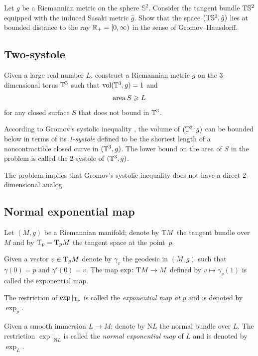 \begin{pr}
Let $g$ be a Riemannian metric on the sphere $\mathbb{S}^2$.
Consider the tangent bundle $\mathrm{T} \mathbb{S}^2$ 
equipped with the induced Sasaki metric $\hat g$.
Show that
the space $(\mathrm{T} \mathbb{S}^2, \hat g)$ lies at bounded distance to the ray $\mathbb{R}_+=[0,\infty)$ in the sense of Gromov--Hausdorff.
\end{pr}


\subsection*{Two-systole}

\begin{pr} Given a large real number $L$,
construct a Riemannian metric $g$ on the 3-dimensional torus $\mathbb{T}^3$ such that $\operatorname{\rm vol}\nolimits(\mathbb{T}^3,g)=1$
and \[\operatorname{\rm area}\nolimits S\geqslant L\]
for any closed surface $S$ that does not bound in $\mathbb{T}^3$.
\end{pr}

According to Gromov's systolic inequality \cite{gromov-filling}, the volume of $(\mathbb{T}^3,g)$ can be bounded below in terms of its \emph{1-systole} defined to be the shortest length of a noncontractible closed curve in $(\mathbb{T}^3,g)$.
The lower bound on the area of $S$ in the problem is called the 2-systole of $(\mathbb{T}^3,g)$.

The problem implies that Gromov's systolic inequality does not have a direct 2-dimensional analog.

\subsection*{Normal exponential map\easy}
\label{Normal exponential map}
\label{page:Normal exponential map}

Let $(M,g)$ be a Riemannian manifold;
denote by $\mathrm{T} M$ the tangent bundle over $M$ and by $\mathrm{T}_p=\mathrm{T}_pM$ the tangent space at the point~$p$.

Given a vector $v\in\mathrm{T}_pM$ denote by $\gamma_v$ the geodesic in $(M,g)$
such that $\gamma(0)=p$ and $\gamma'(0)=v$.
The map $\exp\colon\mathrm{T} M\to M$ defined by $v\mapsto \gamma_v(1)$ is called the exponential map.

The restriction of $\exp|_{\mathrm{T}_p}$ is called the \emph{exponential map at} $p$ and is denoted by $\exp_p$.

Given a smooth immersion $L\to M$;
denote by $\mathrm{N} L$ the normal bundle over $L$.
The restriction $\exp|_{\mathrm{N} L}$ is called the {}\emph{normal exponential map} of $L$ and is denoted by $\exp_L$.

